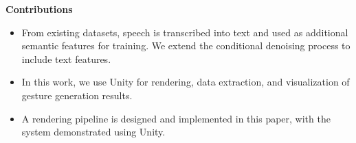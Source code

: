 %	
%	
%	
%	

\textbf{Contributions}

\begin{itemize}
	\item From existing datasets, speech is transcribed into text and used as additional semantic features for training. We extend the conditional denoising process to include text features.
	
	
	\item In this work, we use Unity for rendering, data extraction, and visualization of gesture generation results.
	
	\item A rendering pipeline is designed and implemented in this paper, with the system demonstrated using Unity.
\end{itemize}

